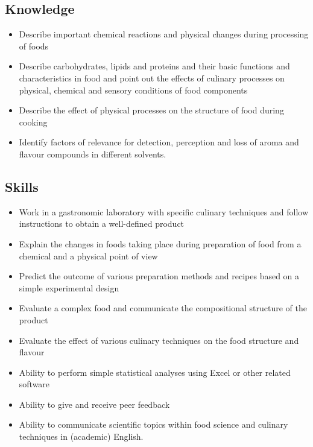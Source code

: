\subsection{Knowledge}
\begin{highlight}
    \begin{itemize}
        \item Describe important chemical reactions and physical changes during processing of foods
        \item Describe carbohydrates, lipids and proteins and their basic functions and characteristics in food and point out the effects of culinary processes on physical, chemical and sensory conditions of food components
        \item Describe the effect of physical processes on the structure of food during cooking
        \item Identify factors of relevance for detection, perception and loss of aroma and flavour compounds in different solvents.
    \end{itemize}
\end{highlight}

\subsection{Skills}
\begin{highlight}
    \begin{itemize}
        \item Work in a gastronomic laboratory with specific culinary techniques and follow instructions to obtain a well-defined product
        \item Explain the changes in foods taking place during preparation of food from a chemical and a physical point of view
        \item Predict the outcome of various preparation methods and recipes based on a simple experimental design
        \item Evaluate a complex food and communicate the compositional structure of the product
        \item Evaluate the effect of various culinary techniques on the food structure and flavour
        \item Ability to perform simple statistical analyses using Excel or other related software
        \item Ability to give and receive peer feedback
        \item Ability to communicate scientific topics within food science and culinary techniques in (academic) English.
\end{itemize}
\end{highlight} 


